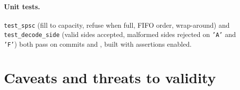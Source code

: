 \documentclass[10pt,a4paper]{article}
\newcommand{\code}[1]{\texttt{#1}}
\begin{document}
\paragraph{Unit tests.} \code{test\_spsc} (fill to capacity, refuse when full, FIFO order, wrap-around) and
\code{test\_decode\_side} (valid sides accepted, malformed sides rejected on \code{'A'} and \code{'F'}) both pass on
commits \code{\Commit} and \code{\CountersCommit}, built with assertions enabled.

\section{Caveats and threats to validity}
\label{sec:caveats}
\end{document}
